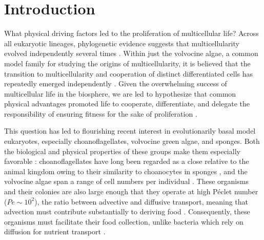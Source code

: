 
\chapter{Introduction} %

\ifpdf
    \graphicspath{{Chapter1/Figs/Raster/}{Chapter1/Figs/PDF/}{Chapter1/Figs/}}
\else
    \graphicspath{{Chapter1/Figs/Vector/}{Chapter1/Figs/}}
\fi

What physical driving factors led to the proliferation of multicellular life?
Across all eukaryotic lineages, phylogenetic evidence suggests that multicellularity evolved independently several times \citep{king2004}.
Within just the volvocine algae, a common model family for studying the origins of multicellularity, it is believed that the transition to multicellularity and cooperation of distinct differentiated cells has repeatedly emerged independently \citep{herron2008}.
Given the overwhelming success of multicellular life in the biosphere, we are led to hypothesize that common physical advantages promoted life to cooperate, differentiate, and delegate the responsibility of ensuring fitness for the sake of proliferation \citep{grosberg2007}.

This question has led to flourishing recent interest in evolutionarily basal model eukaryotes, especially choanoflagellates, volvocine green algae, and sponges.
Both the biological and physical properties of these groups make them especially favorable \citep{goldstein2015}: choanoflagellates have long been regarded as a close relative to the animal kingdom owing to their similarity to choanocytes in sponges \citep{james1871}, and the volvocine algae span a range of cell numbers per individual \citep{kirk2005}.
These organisms and their colonies are also large enough that they operate at high P\'eclet number ($Pe \sim 10^2$), the ratio between advective and diffusive transport, meaning that advection must contribute substantially to deriving food \citep{solari2006}. 
Consequently, these organisms must facilitate their food collection, unlike bacteria which rely on diffusion for nutrient transport \citep{berg1977}.


